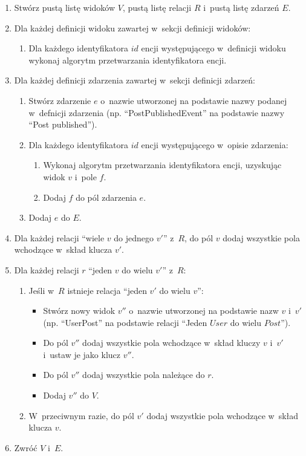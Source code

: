 \begin{enumerate}
 \item Stwórz pustą listę widoków $V$, pustą listę relacji $R$ i~pustą listę zdarzeń $E$.
 \item Dla każdej definicji widoku zawartej w~sekcji definicji widoków:
  \begin{enumerate}
   \item Dla każdego identyfikatora $id$ encji występującego w~definicji widoku wykonaj algorytm przetwarzania identyfikatora encji.
  \end{enumerate}
 
 \item Dla każdej definicji zdarzenia zawartej w~sekcji definicji zdarzeń:
  \begin{enumerate}
   \item Stwórz zdarzenie $e$ o~nazwie utworzonej na podstawie nazwy podanej w~defnicji zdarzenia (np. ``PostPublishedEvent'' na podstawie nazwy ``Post published'').
   \item Dla każdego identyfikatora $id$ encji występującego w~opisie zdarzenia:
    \begin{enumerate}
     \item Wykonaj algorytm przetwarzania identyfikatora encji, uzyskując widok $v$ i~pole $f$.
     \item Dodaj $f$ do pól zdarzenia $e$.
    \end{enumerate}
   \item Dodaj $e$ do $E$.
  \end{enumerate}
  
 \item Dla każdej relacji ``wiele $v$ do jednego $v'$'' z~$R$, do pól $v$ dodaj wszystkie pola wchodzące w~skład klucza $v'$.
 
 \item Dla każdej relacji $r$ ``jeden $v$ do wielu $v'$'' z~$R$:
  \begin{enumerate}
   \item Jeśli w~$R$ istnieje relacja ``jeden $v'$ do wielu $v$'':
    \begin{itemize}
     \item Stwórz nowy widok $v''$ o~nazwie utworzonej na podstawie nazw $v$ i~$v'$ (np. ``UserPost'' na podstawie relacji ``Jeden $User$ do wielu $Post$'').
     \item Do pól $v''$ dodaj wszystkie pola wchodzące w~skład kluczy $v$ i~$v'$ i~ustaw je jako klucz $v''$.
     \item Do pól $v''$ dodaj wszystkie pola należące do $r$.
     \item Dodaj $v''$ do $V$.
    \end{itemize}
   \item W~przeciwnym razie, do pól $v'$ dodaj wszystkie pola wchodzące w~skład klucza $v$.
  \end{enumerate}

  \item Zwróć $V$ i~$E$.
\end{enumerate}


